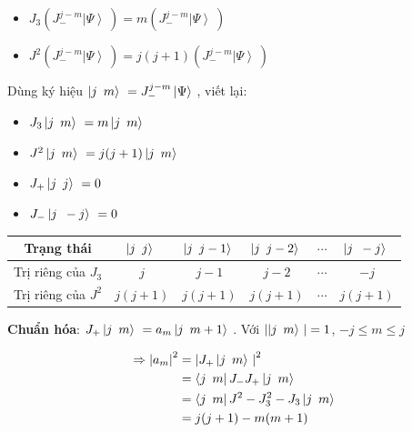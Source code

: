 \documentclass{report}
\begin{document}
	\begin{itemize}
		\item \(J_{3} \left( J_{-}^{j-m}  \left| {\Psi} \right\rangle\ \right) = m \left( J_{-}^{j-m}  \left| {\Psi} \right\rangle\ \right) \)
		\item \(J^{2}  \left( J_{-}^{j-m}  \left| {\Psi} \right\rangle\ \right) = j(j+1)  \left( J_{-}^{j-m}  \left| {\Psi} \right\rangle\ \right) \)
	\end{itemize}

Dùng ký hiệu \( \left| {j \enskip m} \right\rangle\ = J_{-}^{j-m}  \left| {\Psi} \right\rangle\ \), viết lại:

	\begin{itemize}
		\item \(J_{3} \left| {j \enskip m} \right\rangle\ = m \left| {j \enskip m} \right\rangle\ \)
		\item \(J^{2} \left| {j \enskip m} \right\rangle\ = j(j+1) \left| {j \enskip m} \right\rangle\ \)
		\item \( J_{+} \left| {j \enskip j} \right\rangle\ = 0 \)
		\item \( J_{-} \left| {j \enskip -j} \right\rangle\ = 0 \)
	\end{itemize}
	
	\begin{center}
		\begin{tabular}{ |c|c|c|c|c|c| } 
 			\hline
 			Trạng thái & \( \left| {j \enskip j} \right\rangle\ \) &\( \left| {j \enskip j-1} \right\rangle\ \) & \( \left| {j \enskip j-2} \right\rangle\ \) & \( \cdots \) & \( \left| {j \enskip -j} \right\rangle\ \) \\ 
 			\hline
 			Trị riêng của \(J_{3}\) & \(j\) & \(j-1\) & \(j-2\) & \(\cdots\) & \(-j\) \\
 			\hline 
 			Trị riêng của \(J^{2}\) & \(j(j+1)\) & \(j(j+1)\) & \(j(j+1)\) & \(\cdots\) & \(j(j+1)\) \\ 
 			\hline
		\end{tabular}
	\end{center}

\textbf{Chuẩn hóa}: \( J_{+} \left| j \enskip m \right\rangle\ = a_{m} \left| j \enskip m+1 \right\rangle\ \). Với  \( \left| \left| {j \enskip m} \right\rangle\ \right| = 1 \), \( -j \leq m \leq j \)

	\begin{align*}
		\Rightarrow \left| a_{m} \right|^{2} & = \left| J_{+} \left| j \enskip m \right\rangle\ \right|^{2} \\
		& = \left\langle j \enskip m \right| J_{-} J_{+} \left| {j \enskip m} \right\rangle\ \\
		& = \left\langle j \enskip m \right| J^{2} - J_{3}^{2} - J_{3} \left| {j \enskip m} \right\rangle\ \\
		& = j(j+1) - m(m+1)
	\end{align*}
	
\end{document}
